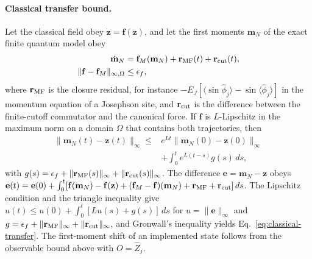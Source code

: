 \documentclass[pra,twocolumn,superscriptaddress,nofootinbib,floatfix]{revtex4-2}
\theoremstyle{remark}
\begin{document}
\paragraph{Classical transfer bound.}
Let the classical field obey \(\dot{\mathbf z}=\mathbf f(\mathbf z)\), and let the first moments \(\mathbf m_N\) of the exact finite quantum model obey
\begin{align}
\dot{\mathbf m}_N&=\mathbf f_M(\mathbf m_N)+\mathbf r_{\rm MF}(t)+\mathbf r_{\rm cut}(t),\nonumber\\
\|\mathbf f-\mathbf f_M\|_{\infty,\Omega}&\le\epsilon_f,
\end{align}
where \(\mathbf r_{\rm MF}\) is the closure residual, for instance \(-E_J[\langle\sin\hat\phi_j\rangle-\sin\langle\hat\phi_j\rangle]\) in the momentum equation of a Josephson site, and \(\mathbf r_{\rm cut}\) is the difference between the finite-cutoff commutator and the canonical force. If \(\mathbf f\) is \(L\)-Lipschitz in the maximum norm on a domain \(\Omega\) that contains both trajectories, then
\begin{align}
\|\mathbf m_N(t)-\mathbf z(t)\|_\infty
\le{}& e^{Lt}\|\mathbf m_N(0)-\mathbf z(0)\|_\infty\nonumber\\
&+\int_0^t e^{L(t-s)}g(s)\,ds,
\label{eq:classical-transfer}
\end{align}
with \(g(s)=\epsilon_f+\|\mathbf r_{\rm MF}(s)\|_\infty+\|\mathbf r_{\rm cut}(s)\|_\infty\). The difference \(\mathbf e=\mathbf m_N-\mathbf z\) obeys \(\mathbf e(t)=\mathbf e(0)+\int_0^t[\mathbf f(\mathbf m_N)-\mathbf f(\mathbf z)+(\mathbf f_M-\mathbf f)(\mathbf m_N)+\mathbf r_{\rm MF}+\mathbf r_{\rm cut}]\,ds\). The Lipschitz condition and the triangle inequality give \(u(t)\le u(0)+\int_0^t[Lu(s)+g(s)]\,ds\) for \(u=\|\mathbf e\|_\infty\) and \(g=\epsilon_f+\|\mathbf r_{\rm MF}\|_\infty+\|\mathbf r_{\rm cut}\|_\infty\), and Gronwall's inequality yields Eq.~\eqref{eq:classical-transfer}. The first-moment shift of an implemented state follows from the observable bound above with \(O=\hat Z_j\).
\end{document}
